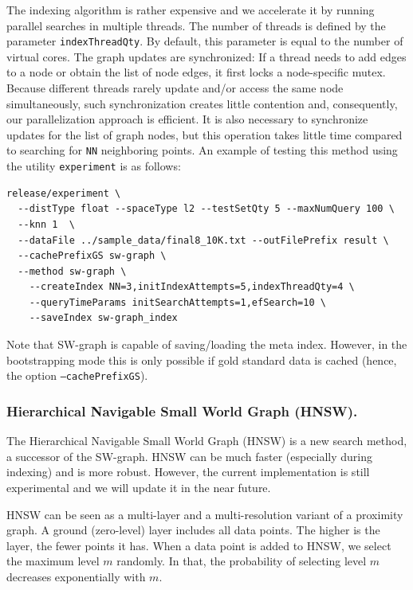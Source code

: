 \documentclass[runningheads,a4paper]{llncs}
\newcommand{\ttt}[1]{\texttt{#1}}
\begin{document}
The indexing algorithm is rather expensive and we accelerate it by running parallel searches in multiple threads. The number of threads is defined by the parameter \ttt{indexThreadQty}. By default, this parameter is equal to the number of virtual cores.
The graph updates are synchronized: If a thread  needs to add edges to a node or obtain
the list of node edges, it first locks a node-specific mutex.
Because different threads rarely update and/or access the same node simultaneously,
such synchronization creates little contention and, consequently,
our parallelization approach is efficient.
It is also necessary to synchronize updates for the list of graph nodes, 
but this operation takes little time compared to searching for \ttt{NN} neighboring points.
An example of testing this method using the utility \texttt{experiment} is as follows:
{
\footnotesize
\begin{verbatim}
release/experiment \
  --distType float --spaceType l2 --testSetQty 5 --maxNumQuery 100 \
  --knn 1  \
  --dataFile ../sample_data/final8_10K.txt --outFilePrefix result \
  --cachePrefixGS sw-graph \
  --method sw-graph \
    --createIndex NN=3,initIndexAttempts=5,indexThreadQty=4 \
    --queryTimeParams initSearchAttempts=1,efSearch=10 \
    --saveIndex sw-graph_index
\end{verbatim}
}
Note that SW-graph is capable of saving/loading the meta index. However, in the bootstrapping
mode this is only possible if gold standard data is cached (hence, the option \ttt{--cachePrefixGS}).

\subsubsection{Hierarchical Navigable Small World Graph (HNSW).} \label{SectionHNSW}

The Hierarchical Navigable Small World Graph (HNSW) \cite{Malkov2016} is a new search method,
a successor of the SW-graph.
HNSW can be much faster (especially during indexing) and is more robust.
However, the current implementation is still experimental and we will update it in the near future.

HNSW can be seen as a multi-layer and a multi-resolution variant of a proximity graph.
A ground (zero-level) layer includes all data points. The higher is the layer, the fewer points it has.
When a data point is added to HNSW, we select the maximum level $m$ randomly. 
In that, the probability of selecting level $m$ decreases exponentially with $m$.
\end{document}
